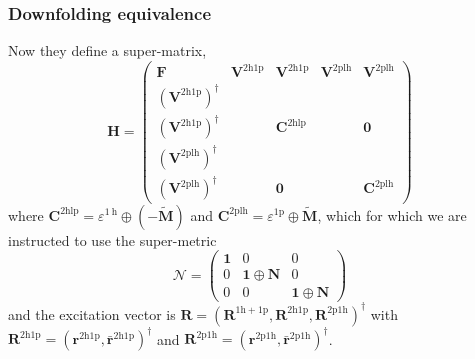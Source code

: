 \subsubsection{Downfolding equivalence}
Now they define a super-matrix,
\begin{equation}
\bm{H} =
\begin{pmatrix}
\bm{F} & \bm{V}^{2\mathrm{h1p}} & \bm{V}^{2\mathrm{h1p}} & \bm{V}^{2\mathrm{plh}} & \bm{V}^{2\mathrm{plh}} \\
\left(\bm{V}^{2\mathrm{h1p}}\right)^{\dagger} &  &  & & \\
\left(\bm{V}^{2\mathrm{h1p}}\right)^{\dagger} &  & \bm{C}^{2\mathrm{hlp}} & & \bm{0} \\
\left(\bm{V}^{2\mathrm{plh}}\right)^{\dagger} & & & & \\
\left(\bm{V}^{2\mathrm{plh}}\right)^{\dagger} &  & \bm{0} & & \bm{C}^{2\mathrm{plh}}
\end{pmatrix}
\end{equation}
where $\mathbf{C}^{2 \mathrm{hlp}}=\varepsilon^{1 \mathrm{~h}} \oplus(-\tilde{\mathbf{M}})$ and $\mathbf{C}^{2 \mathrm{plh}}=\varepsilon^{1 \mathrm{p}} \oplus \tilde{\mathbf{M}}$, which for which we are instructed to use the super-metric
$$
\bm{\mathcal{N}}=\left(\begin{array}{ccc}
\bm{1} & 0 & 0 \\
0 & \bm{1} \oplus \bm{N} & 0 \\
0 & 0 & \bm{1} \oplus \bm{N}
\end{array}\right)
$$
and the excitation vector is $\bm{R} = (\bm{R}^{1\mathrm{h}+1\mathrm{p}}, \bm{R}^{2\mathrm{h}1\mathrm{p}}, \bm{R}^{2\mathrm{p}1\mathrm{h}})^\dag$ with $\bm{R}^{2\mathrm{h}1\mathrm{p}}=(\bm{r}^{2\mathrm{h}1\mathrm{p}}, \bm{\bar{r}}^{2\mathrm{h}1\mathrm{p}})^\dag$ and $\bm{R}^{2\mathrm{p}1\mathrm{h}}=(\bm{r}^{2\mathrm{p}1\mathrm{h}}, \bm{\bar{r}}^{2\mathrm{p}1\mathrm{h}})^\dag$.

